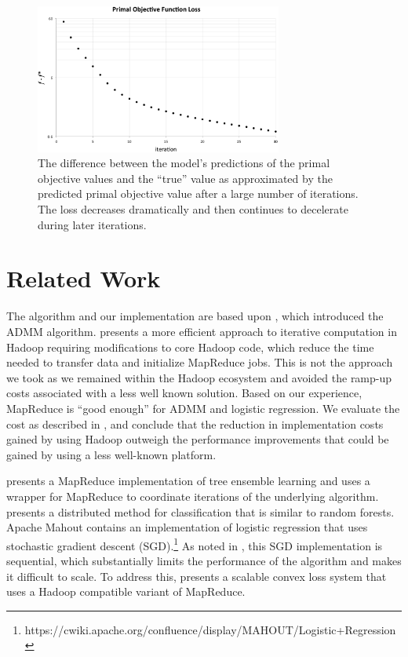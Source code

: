 \documentclass[10pt, conference, compsocconf]{IEEEtran}
\begin{document}
\begin{figure}[!t]
\centering
\includegraphics[width=3.2in]{primal_objective_loss}
\caption{The difference between the model's predictions of the primal objective values and the ``true'' value as approximated by the predicted primal objective value after a large number of iterations. The loss decreases dramatically and then continues to decelerate during later iterations.}
\label{fig:iter}
\end{figure}

\section{Related Work}\label{sec:related}
The algorithm and our implementation are based upon \cite{boyd}, which introduced the ADMM algorithm.  \cite{bu2010} presents a more efficient approach to iterative computation in Hadoop requiring modifications to core Hadoop code, which reduce the time needed to transfer data and initialize MapReduce jobs.  This is not the approach we took as we remained within the Hadoop ecosystem and avoided the ramp-up costs associated with a less well known solution.  Based on our experience, MapReduce is ``good enough'' for ADMM and logistic regression.  We evaluate the cost as described in \cite{lin2012}, and conclude that the reduction in implementation costs gained by using Hadoop outweigh the performance improvements that could be gained by using a less well-known platform. 

\cite{planet} presents a MapReduce implementation of tree ensemble learning and uses a wrapper for MapReduce to coordinate iterations of the underlying algorithm.  \cite{linkolcz2012} presents a distributed method for classification that is similar to random forests. Apache Mahout contains an implementation of logistic regression that uses stochastic gradient descent (SGD).\footnote{https://cwiki.apache.org/confluence/display/MAHOUT/Logistic+Regression}  As noted in \cite{agarwal2011}, this SGD implementation is sequential, which substantially limits the performance of the algorithm and makes it difficult to scale.  To address this, \cite{agarwal2011} presents a scalable convex loss system that uses a Hadoop compatible variant of MapReduce.
\end{document}
